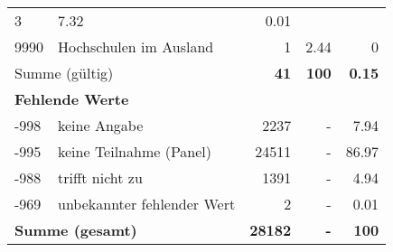 \begin{longtable}{lXrrr}
       \num{3} &
       \num[round-mode=places,round-precision=2]{7.32} &
         \num[round-mode=places,round-precision=2]{0.01} \\

     9990 &
     \multicolumn{1}{X}{ Hochschulen im Ausland   } &


       \num{1} &
       \num[round-mode=places,round-precision=2]{2.44} &
         \num[round-mode=places,round-precision=2]{0} \\
     \midrule
     \multicolumn{2}{l}{Summe (gültig)} &
       \textbf{\num{41}} &
     \textbf{100} &
       \textbf{\num[round-mode=places,round-precision=2]{0.15}} \\
     \multicolumn{5}{l}{\textbf{Fehlende Werte}}\\
       -998 &
       keine Angabe &
         \num{2237} &
        - &
         \num[round-mode=places,round-precision=2]{7.94} \\
       -995 &
       keine Teilnahme (Panel) &
         \num{24511} &
        - &
         \num[round-mode=places,round-precision=2]{86.97} \\
       -988 &
       trifft nicht zu &
         \num{1391} &
        - &
         \num[round-mode=places,round-precision=2]{4.94} \\
       -969 &
       unbekannter fehlender Wert &
         \num{2} &
        - &
         \num[round-mode=places,round-precision=2]{0.01} \\
     \midrule
     \multicolumn{2}{l}{\textbf{Summe (gesamt)}} &
          \textbf{\num{28182}} &
        \textbf{-} &
        \textbf{100} \\
     \bottomrule
     \end{longtable}
     
